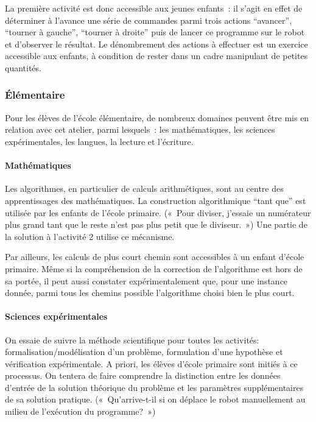 \documentclass[11pt,a4paper]{article}
\begin{document}
La première activité est donc accessible aux jeunes enfants~: il
s'agit en effet de déterminer à l'avance une série de commandes parmi
trois actions ``avancer'', ``tourner à gauche'', ``tourner à droite''
puis de lancer ce programme sur le robot et d'observer le résultat.
Le dénombrement des actions à effectuer est un exercice accessible aux
enfants, à condition de rester dans un cadre manipulant de petites quantités. 

\subsubsection{Élémentaire}

Pour les élèves de l'école élémentaire, de nombreux domaines peuvent
être mis en relation avec cet atelier, parmi lesquels~: les
mathématiques, les sciences expérimentales, les langues, la lecture et
l'écriture. 

\paragraph{Mathématiques} 
Les algorithmes, en particulier de calculs arithmétiques, sont
au centre des apprentissages des mathématiques. La construction algorithmique ``tant que'' 
est utilisée par les enfants de l'école primaire. («~Pour diviser, j'essaie un numérateur 
plus grand tant que le reste n'est pas plus petit que le diviseur.~») 
Une partie de la solution à l'activité 2 utilise ce mécanisme. 

Par ailleurs, les calculs de plus court chemin sont accessibles à un
enfant d'école primaire. Même si la compréhension de la correction de
l'algorithme est hors de sa portée, il peut aussi constater
expérimentalement que, pour une instance donnée, parmi tous les
chemins possible l'algorithme choisi bien le plus court.

\paragraph{Sciences expérimentales}

On essaie de suivre la méthode scientifique pour toutes les activités:
formalisation/modélisation d'un problème, formulation d'une hypothèse
et vérification expérimentale. A priori, les élèves d'école primaire
sont initiés à ce processus. On tentera de faire comprendre la
distinction entre les données d'entrée de la solution théorique du
problème et les paramètres supplémentaires de sa solution pratique.
(«~Qu'arrive-t-il si on déplace le robot manuellement au milieu de
  l'exécution du programme?~»)
\end{document}
